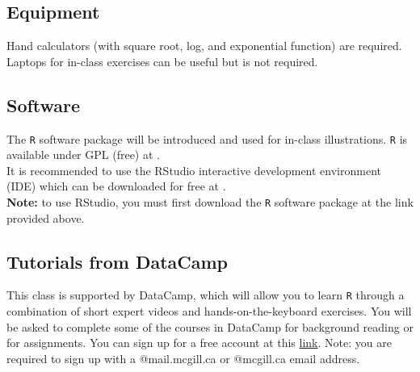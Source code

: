 \documentclass[]{article}
\begin{document}
\subsection{Equipment}
Hand calculators (with square root, log, and exponential function) are required. Laptops for in-class exercises can be useful but is not required.   


\subsection{Software}
The \texttt{R} software package will be introduced and used for in-class illustrations. \texttt{R} is available under GPL (free) at \href{http://cran.r-project.org/}{\color{blue}{http://cran.r-project.org/}}. \\

\noindent
It is recommended to use the RStudio interactive development environment (IDE) which can be downloaded for free at \href{http://www.rstudio.com/}{\color{blue}{http://www.rstudio.com/}}.\\ 
\textbf{Note:} to use RStudio, you must first download the  \texttt{R}
software package at the link provided above.

\subsection{Tutorials from DataCamp}
This class is supported by DataCamp, which will allow you to learn \texttt{R} through a combination of short expert videos and hands-on-the-keyboard exercises. You will be asked to complete some of the courses in DataCamp for background reading or for assignments. You can sign up for a free account at this \href{https://www.datacamp.com/groups/shared_links/a10245cf1485dc55a1ee21a23d6dfe6ae703fd60}{link}. Note: you are required to sign up with a @mail.mcgill.ca or @mcgill.ca email address.



\end{document}

